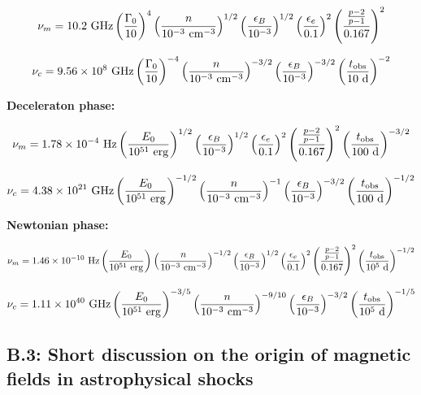 $$\nu_m = 10.2~\rm{GHz} \left(\frac{\Gamma_0}{10} \right)^{4} \left(\frac{n}{10^{-3}~\rm{cm}^{-3}} \right)^{1/2} \left(\frac{\epsilon_B}{10^{-3}} \right)^{1/2} \left(\frac{\epsilon_e}{0.1} \right)^{2} \left(\frac{\frac{p - 2}{p - 1}}{0.167} \right)^{2}$$


$$\nu_c = 9.56 \times 10^8~\rm{GHz} \left(\frac{\Gamma_0}{10} \right)^{-4} \left(\frac{n}{10^{-3}~\rm{cm}^{-3}} \right)^{-3/2} \left(\frac{\epsilon_B}{10^{-3}} \right)^{-3/2}  \left(\frac{t_{\rm{obs}}}{10~\rm{d}} \right)^{-2}$$


\bf{Deceleraton phase:}

$$\nu_m = 1.78 \times 10^{-4}~\rm{Hz} \left(\frac{E_0}{10^{51}~\rm{erg}} \right)^{1/2}  \left(\frac{\epsilon_B}{10^{-3}} \right)^{1/2} \left(\frac{\epsilon_e}{0.1} \right)^{2} \left(\frac{\frac{p - 2}{p - 1}}{0.167} \right)^{2} \left(\frac{t_{\rm{obs}}}{100~\rm{d}} \right)^{-3/2} $$


$$\nu_c = 4.38 \times 10^{21}~\rm{GHz} \left(\frac{E_0}{10^{51}~\rm{erg}} \right)^{-1/2} \left(\frac{n}{10^{-3}~\rm{cm}^{-3}} \right)^{-1} \left(\frac{\epsilon_B}{10^{-3}} \right)^{-3/2} \left(\frac{t_{\rm{obs}}}{100~\rm{d}} \right)^{-1/2}$$


\bf{Newtonian phase:}

$$\nu_m = 1.46 \times 10^{-10}~\rm{Hz} \left(\frac{E_0}{10^{51}~\rm{erg}} \right)^{} \left(\frac{n}{10^{-3}~\rm{cm}^{-3}} \right)^{-1/2} \left(\frac{\epsilon_B}{10^{-3}} \right)^{1/2} \left(\frac{\epsilon_e}{0.1} \right)^{2} \left(\frac{\frac{p - 2}{p - 1}}{0.167} \right)^{2} \left(\frac{t_{\rm{obs}}}{10^5~\rm{d}} \right)^{-1/2} $$

$$\nu_c = 1.11 \times 10^{40}~\rm{GHz} \left(\frac{E_0}{10^{51}~\rm{erg}} \right)^{-3/5} \left(\frac{n}{10^{-3}~\rm{cm}^{-3}} \right)^{-9/10} \left(\frac{\epsilon_B}{10^{-3}} \right)^{-3/2} \left(\frac{t_{\rm{obs}}}{10^5~\rm{d}} \right)^{-1/5} $$

\subsection*{B.3: Short discussion on the origin of magnetic fields in astrophysical shocks}
